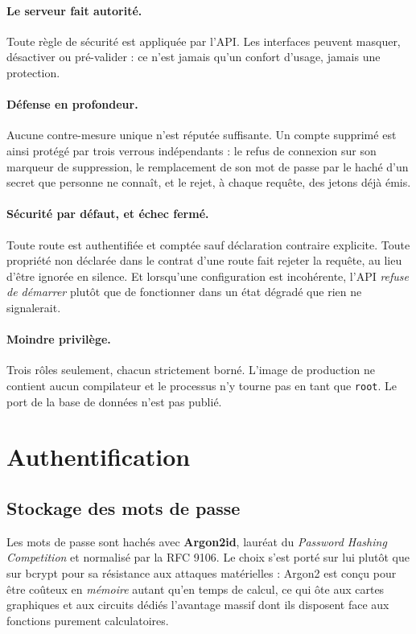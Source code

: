 \paragraph{Le serveur fait autorité.} Toute règle de sécurité est appliquée par
l'API. Les interfaces peuvent masquer, désactiver ou pré-valider : ce n'est
jamais qu'un confort d'usage, jamais une protection.

\paragraph{Défense en profondeur.} Aucune contre-mesure unique n'est réputée
suffisante. Un compte supprimé est ainsi protégé par trois verrous
indépendants : le refus de connexion sur son marqueur de suppression, le
remplacement de son mot de passe par le haché d'un secret que personne ne
connaît, et le rejet, à chaque requête, des jetons déjà émis.

\paragraph{Sécurité par défaut, et échec fermé.} Toute route est authentifiée
et comptée sauf déclaration contraire explicite. Toute propriété non déclarée
dans le contrat d'une route fait rejeter la requête, au lieu d'être ignorée en
silence. Et lorsqu'une configuration est incohérente, l'API \emph{refuse de
démarrer} plutôt que de fonctionner dans un état dégradé que rien ne
signalerait.

\paragraph{Moindre privilège.} Trois rôles seulement, chacun strictement borné.
L'image de production ne contient aucun compilateur et le processus n'y tourne
pas en tant que \texttt{root}. Le port de la base de données n'est pas publié.

\section{Authentification}

\subsection{Stockage des mots de passe}

Les mots de passe sont hachés avec \textbf{Argon2id}, lauréat du
\textit{Password Hashing Competition} et normalisé par la RFC 9106. Le choix
s'est porté sur lui plutôt que sur bcrypt pour sa résistance aux attaques
matérielles : Argon2 est conçu pour être coûteux en \emph{mémoire} autant qu'en
temps de calcul, ce qui ôte aux cartes graphiques et aux circuits dédiés
l'avantage massif dont ils disposent face aux fonctions purement calculatoires.

